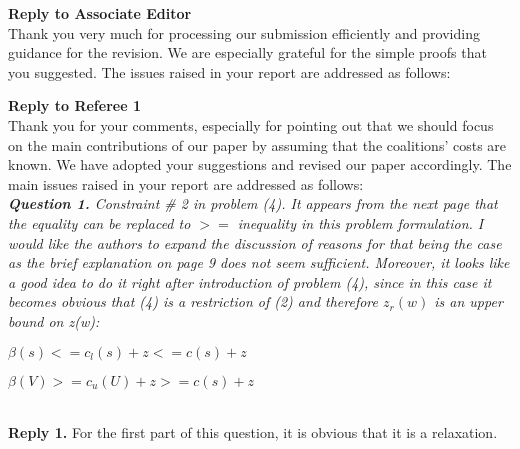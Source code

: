 \documentclass[11pt]{article}
\begin{document}

\newpage

\noindent \textbf{\large Reply to Associate Editor}
\\[3mm]
Thank you very much for processing our submission efficiently and providing guidance for the revision.
We are especially grateful for the simple proofs that you suggested.
The issues raised in your report are addressed as follows:
\\[4mm]


\newpage

\noindent \textbf{\large Reply to Referee 1}
\\[3mm]
Thank you for your comments, especially for pointing out that we should focus on the main contributions of our paper by assuming that the coalitions' costs are known. We have adopted your suggestions and revised our paper accordingly. The main issues raised in your report are addressed as follows:
\\[4mm]
%
%
\noindent \textit{\textbf{Question 1.}
Constraint \# 2 in problem (4). It appears from the next page that the equality can be replaced to $>=$ inequality in this problem formulation. I would like the authors to expand the discussion of reasons for that being the case as the brief explanation on page 9 does not seem sufficient. Moreover, it looks like a good idea to do it right after introduction of problem (4), since in this case it becomes obvious that (4) is a restriction of (2) and therefore $z_r(w)$ is an upper bound on z(w):}

$\beta(s) <= c_l(s) + z <= c(s) + z$

$\beta(V) >= c_u(U) + z >= c(s) + z$

\\[2mm]
\noindent \textbf{Reply 1.}
For the first part of this question, it is obvious that it is a relaxation.
\end{document}
